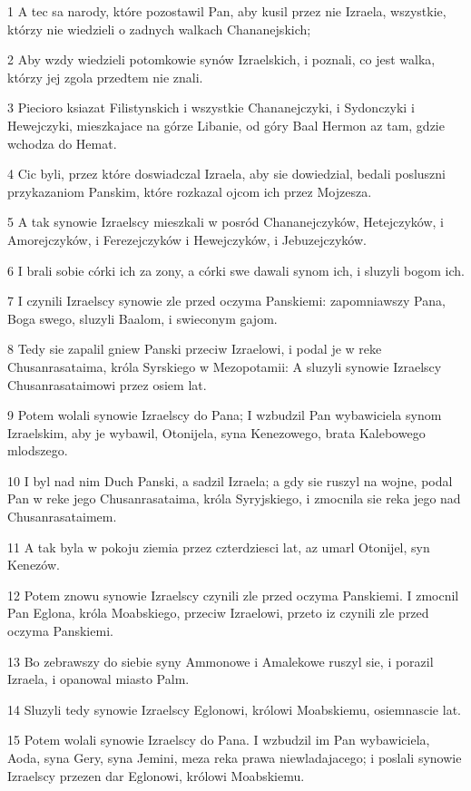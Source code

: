 \par 1 A tec sa narody, które pozostawil Pan, aby kusil przez nie Izraela, wszystkie, którzy nie wiedzieli o zadnych walkach Chananejskich;
\par 2 Aby wzdy wiedzieli potomkowie synów Izraelskich, i poznali, co jest walka, którzy jej zgola przedtem nie znali.
\par 3 Piecioro ksiazat Filistynskich i wszystkie Chananejczyki, i Sydonczyki i Hewejczyki, mieszkajace na górze Libanie, od góry Baal Hermon az tam, gdzie wchodza do Hemat.
\par 4 Cic byli, przez które doswiadczal Izraela, aby sie dowiedzial, bedali posluszni przykazaniom Panskim, które rozkazal ojcom ich przez Mojzesza.
\par 5 A tak synowie Izraelscy mieszkali w posród Chananejczyków, Hetejczyków, i Amorejczyków, i Ferezejczyków i Hewejczyków, i Jebuzejczyków.
\par 6 I brali sobie córki ich za zony, a córki swe dawali synom ich, i sluzyli bogom ich.
\par 7 I czynili Izraelscy synowie zle przed oczyma Panskiemi: zapomniawszy Pana, Boga swego, sluzyli Baalom, i swieconym gajom.
\par 8 Tedy sie zapalil gniew Panski przeciw Izraelowi, i podal je w reke Chusanrasataima, króla Syrskiego w Mezopotamii: A sluzyli synowie Izraelscy Chusanrasataimowi przez osiem lat.
\par 9 Potem wolali synowie Izraelscy do Pana; I wzbudzil Pan wybawiciela synom Izraelskim, aby je wybawil, Otonijela, syna Kenezowego, brata Kalebowego mlodszego.
\par 10 I byl nad nim Duch Panski, a sadzil Izraela; a gdy sie ruszyl na wojne, podal Pan w reke jego Chusanrasataima, króla Syryjskiego, i zmocnila sie reka jego nad Chusanrasataimem.
\par 11 A tak byla w pokoju ziemia przez czterdziesci lat, az umarl Otonijel, syn Kenezów.
\par 12 Potem znowu synowie Izraelscy czynili zle przed oczyma Panskiemi. I zmocnil Pan Eglona, króla Moabskiego, przeciw Izraelowi, przeto iz czynili zle przed oczyma Panskiemi.
\par 13 Bo zebrawszy do siebie syny Ammonowe i Amalekowe ruszyl sie, i porazil Izraela, i opanowal miasto Palm.
\par 14 Sluzyli tedy synowie Izraelscy Eglonowi, królowi Moabskiemu, osiemnascie lat.
\par 15 Potem wolali synowie Izraelscy do Pana. I wzbudzil im Pan wybawiciela, Aoda, syna Gery, syna Jemini, meza reka prawa niewladajacego; i poslali synowie Izraelscy przezen dar Eglonowi, królowi Moabskiemu.
